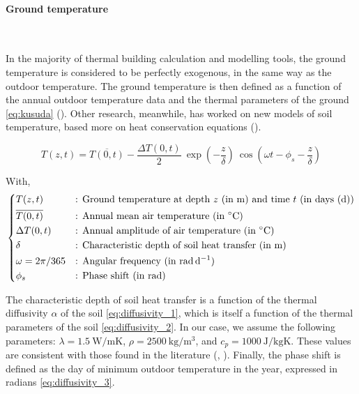 \documentclass[11pt]{article}
\begin{document}

            \paragraph{Ground temperature}\mbox{}\\ %
            \label{par:ground_temperature}
            
            In the majority of thermal building calculation and modelling tools, the ground temperature is considered to be perfectly exogenous, in the same way as the outdoor temperature. The ground temperature is then defined as a function of the annual outdoor temperature data and the thermal parameters of the ground \eqref{eq:kusuda} (\cite{kusuda_earth_1965}). Other research, meanwhile, has worked on new models of soil temperature, based more on heat conservation equations (\cite{badache_new_2016}).  

            \begin{equation}\label{eq:kusuda}
              T(z,t) = \overline{T(0,t)} - \frac{\Delta T(0,t)}{2}~ \exp\left(-\frac{z}{\delta}\right)~ \cos\left(\omega t - \phi_s - \frac{z}{\delta}\right)
            \end{equation}
            
            \noindent
            With,
            $$
            \begin{dcases}
              T(z,t) & \text{: Ground temperature at depth $z$ (in \SI{}{\meter}) and time $t$ (in days (\SI{}{\day}))}\\
              \overline{T(0,t)} & \text{: Annual mean air temperature (in \SI{}{\celsius})}\\
              \Delta T(0,t) & \text{: Annual amplitude of air temperature (in \SI{}{\celsius})}\\
              \delta & \text{: Characteristic depth of soil heat transfer (in \SI{}{\meter})}\\
              \omega=2\pi/365 & \text{: Angular frequency (in \SI{}{\radian\per\day})}\\
              \phi_s & \text{: Phase shift (in \SI{}{\radian})}\\
            \end{dcases}
            $$

            The characteristic depth of soil heat transfer is a function of the thermal diffusivity $\alpha$ of the soil \eqref{eq:diffusivity_1}, which is itself a function of the thermal parameters of the soil \eqref{eq:diffusivity_2}. In our case, we assume the following parameters: $\lambda = \SI{1.5}{\watt\per\meter\kelvin}$, $\rho = \SI{2500}{\kilo\gram\per\cubic\meter}$, and $c_p = \SI{1000}{\joule\per\kilo\gram\kelvin}$. These values are consistent with those found in the literature (\cite{arkhangelskaya_estimating_2018}, \cite{gerard_determination_2020}). Finally, the phase shift is defined as the day of minimum outdoor temperature in the year, expressed in radians \eqref{eq:diffusivity_3}.  
              
\end{document}

